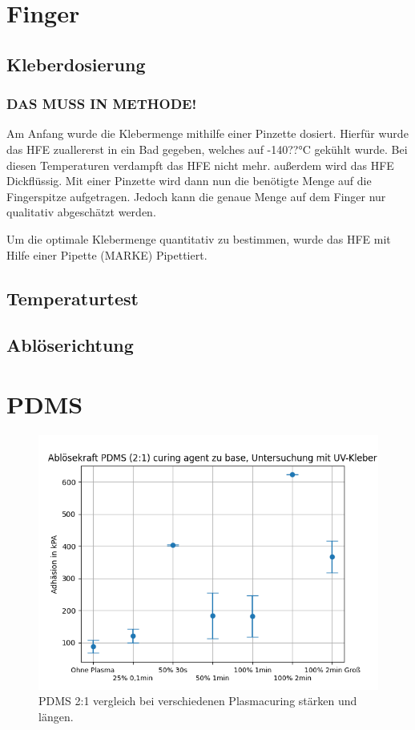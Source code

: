\section{Finger}

\subsection{Kleberdosierung}
	
	\subsubsection{DAS MUSS IN METHODE!}
	Am Anfang wurde die Klebermenge mithilfe einer Pinzette dosiert. Hierfür wurde das HFE zuallererst in ein Bad gegeben, welches auf -140??°C gekühlt wurde. Bei diesen Temperaturen verdampft das HFE nicht mehr. außerdem wird das HFE Dickflüssig. Mit einer Pinzette wird dann nun die benötigte Menge auf die Fingerspitze aufgetragen. Jedoch kann die genaue Menge auf dem Finger nur qualitativ abgeschätzt werden.
	
	Um die optimale Klebermenge quantitativ zu bestimmen, wurde das HFE mit Hilfe einer Pipette (MARKE) Pipettiert. 
	
\subsection{Temperaturtest}
\subsection{Ablöserichtung}


\section{PDMS}

	\begin{figure}[h]
		\includegraphics[width=14cm]{test}
		\caption{PDMS 2:1 vergleich bei verschiedenen Plasmacuring stärken und längen.}
	\end{figure}

